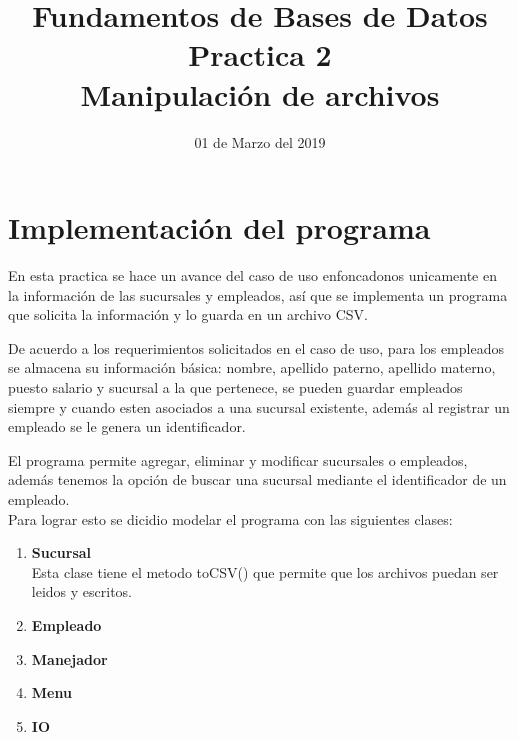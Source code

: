 \documentclass[10pt]{article}
\begin{document}
    \title{Fundamentos de Bases de Datos \\
        Practica 2\\ Manipulación de archivos
        } 
    \author{}
    \date{01 de Marzo del 2019}
    \maketitle
    
    \section{Implementación del programa}\vspace{0.5cm}
    En esta practica se hace un avance del caso de uso enfoncadonos unicamente en la información de las sucursales y empleados, así que se implementa  un programa que solicita la información y lo guarda en un archivo CSV.
    
    De acuerdo a los requerimientos solicitados en el caso de uso, para los empleados se almacena su información básica: nombre, apellido paterno, apellido materno, puesto salario y sucursal a la que pertenece, se pueden guardar empleados siempre y cuando esten asociados a una sucursal existente, además al registrar un empleado se le genera  un identificador.
    
    El programa permite agregar, eliminar y modificar sucursales o empleados, además tenemos
    la opción de buscar una sucursal mediante el identificador de un empleado.\\
    
    
    Para lograr esto se dicidio modelar el programa con las siguientes clases:
    
    \begin{enumerate}
    	\item {\bf{Sucursal}} \\
    	
    	Esta clase tiene el metodo toCSV() que permite que los archivos puedan ser leidos y escritos.
    	
    	\item {\bf{Empleado}}\\
    	
    	
    	\item {\bf{Manejador}}\\
    	
    	\item {\bf{Menu}}\\
    	
    	\item {\bf{IO}}\\
    	
    \end{enumerate} 
\end{document}
